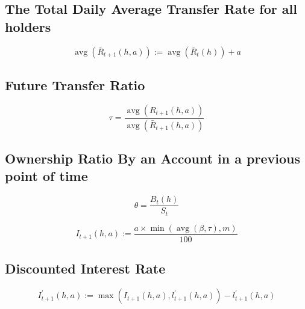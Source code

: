 \begin{tcolorbox}
	\subsection{The Total Daily Average Transfer Rate for all holders }
	\label{total.aggregate.daily.avg.transfer.rate}
	\begin{equation}
		\operatorname{avg}\left(\bar{R}_{t+1}(h, a)\right):=\operatorname{avg}\left(\bar{R}_{t}(h)\right)+a
	\end{equation}
\end{tcolorbox}

\begin{tcolorbox}
	\subsection{ Future Transfer Ratio }
	\begin{equation}
		\tau=\frac{\operatorname{avg}\left(R_{t+1}(h, a)\right)}{\operatorname{avg}\left(\bar{R}_{t+1}(h, a)\right)}
	\end{equation}
\end{tcolorbox}

\begin{tcolorbox}
	\subsection{ Ownership Ratio By an Account in a previous point of time }
	\begin{equation}
		\theta=\frac{B_{t}(h)}{S_{t}}
	\end{equation}
\end{tcolorbox}

\begin{tcolorbox}
	\label{Interest Rate}
	\begin{equation}
		I_{t+1}(h, a):=\frac{a \times \min (\operatorname{avg}(\beta, \tau), m)}{100}
	\end{equation}
\end{tcolorbox}

\begin{tcolorbox}
	\subsection{Discounted Interest Rate}
	\label{Discounted Interest Rate}
	\begin{equation}
		I_{t+1}^{\prime}(h, a):=\max \left(I_{t+1}(h, a), l_{t+1}^{\prime}(h, a)\right)-l_{t+1}^{\prime}(h, a)
	\end{equation}
\end{tcolorbox}


